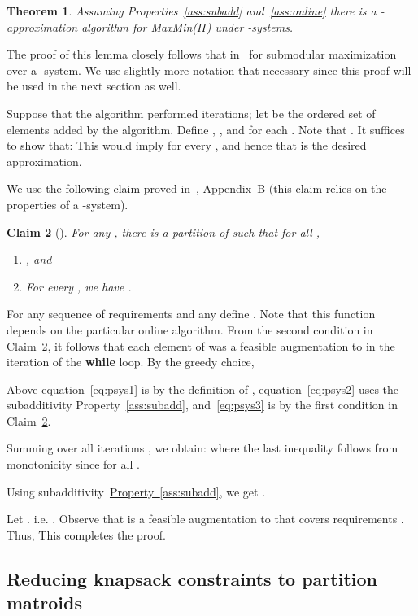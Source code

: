 \documentclass[11pt,letterpaper]{article}
\newcommand{\lref}[2][]{\hyperref[#2]{#1~\ref*{#2}}}
\newtheorem{theorem}{Theorem}[section]
\newtheorem{claim}[theorem]{Claim}
\newenvironment{proof}{

\noindent{\bf Proof:}} {\hfill


}
\def\cov{\ensuremath{\Pi}\xspace}
\def\mmp{{\sf MaxMin(\cov)}\xspace}
\begin{document}
\begin{theorem}\label{thm:maxmin-p-system}
Assuming Properties~\ref{ass:subadd} and~\ref{ass:online} there is a -approximation
algorithm for \mmp under -systems.
\end{theorem}
\begin{proof}
The proof of this lemma closely follows that in~\cite{CCPV07} for submodular maximization over a -system. We use
slightly more notation that necessary since this proof will be used in the next section as well.

Suppose that the algorithm performed  iterations; let  be the ordered set of elements added by
the algorithm. Define , , and  for
each . Note that . It suffices to show that:
 This would imply  for every
, and hence that  is the desired approximation.


We use the following claim proved in~\cite{CCPV07}, Appendix~B (this claim relies on the properties of a -system).

\begin{claim}[\cite{CCPV07}]\label{cl:ccpv}
For any , there is a partition  of  such that for all ,
\begin{enumerate}
 \item , and
 \item For every , we have .
\end{enumerate}
\end{claim}

For any sequence  of requirements and any  define . Note that this function depends on the particular online algorithm. From the second condition in
Claim~\ref{cl:ccpv}, it follows that each element of  was a feasible augmentation to  in
the  iteration of the {\bf while} loop. By the greedy choice,

Above equation~\eqref{eq:psys1} is by the definition of ,
equation~\eqref{eq:psys2} uses the subadditivity Property~\ref{ass:subadd}, and~\eqref{eq:psys3} is by the first
condition in Claim~\ref{cl:ccpv}.

Summing over all iterations , we obtain:
 where the last inequality follows from monotonicity since
   for all .

Using subadditivity~\lref[Property]{ass:subadd}, we get .

Let . i.e.  . Observe that
 is a feasible  augmentation to  that covers requirements . Thus,
 This completes the proof.
\end{proof}

\subsection{Reducing knapsack constraints to partition matroids}
\label{sec:knapsack-mat}
\end{document}
